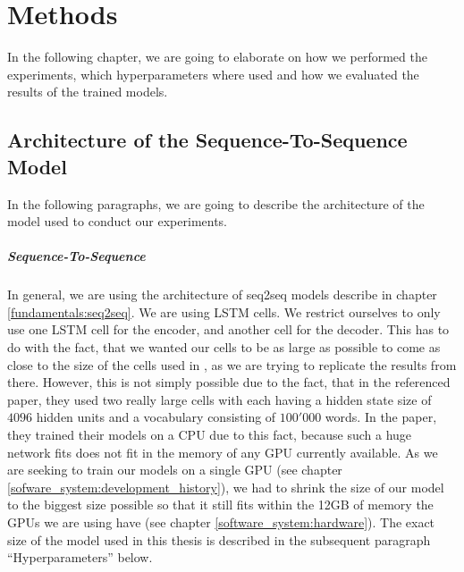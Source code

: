\chapter{Methods}
\label{methods}
In the following chapter, we are going to elaborate on how we performed the experiments, which hyperparameters where used and how we evaluated the results of the trained models.

\section{Architecture of the Sequence-To-Sequence Model}
In the following paragraphs, we are going to describe the architecture of the model used to conduct our experiments.

\paragraph{Sequence-To-Sequence} In general, we are using the architecture of seq2seq models describe in chapter \ref{fundamentals:seq2seq}. We are using LSTM cells. We restrict ourselves to only use one LSTM cell for the encoder, and another cell for the decoder. This has to do with the fact, that we wanted our cells to be as large as possible to come as close to the size of the cells used in \cite{Vinyals:2015}, as we are trying to replicate the results from there. However, this is not simply possible due to the fact, that in the referenced paper, they used two really large cells with each having a hidden state size of $4096$ hidden units and a vocabulary consisting of $100'000$ words. In the paper, they trained their models on a CPU due to this fact, because such a huge network fits does not fit in the memory of any GPU currently available. As we are seeking to train our models on a single GPU (see chapter \ref{sofware_system:development_history}), we had to shrink the size of our model to the biggest size possible so that it still fits within the 12GB of memory the GPUs we are using have (see chapter \ref{software_system:hardware}). The exact size of the model used in this thesis is described in the subsequent paragraph ``Hyperparameters'' below.


